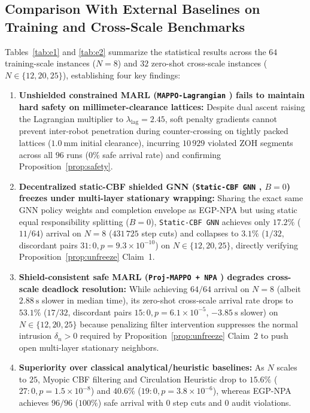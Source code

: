 \subsection{Comparison With External Baselines on Training and Cross-Scale Benchmarks}
Tables~\ref{tab:e1} and \ref{tab:e2} summarize the statistical results across the $64$ training-scale instances ($N=8$) and $32$ zero-shot cross-scale instances ($N\in\{12,20,25\}$), establishing four key findings:
\begin{enumerate}
 \item \textbf{Unshielded constrained MARL (\texttt{MAPPO-Lagrangian} \cite{gu2023safe}) fails to maintain hard safety on millimeter-clearance lattices:} Despite dual ascent raising the Lagrangian multiplier to $\lambda_{\mathrm{lag}}=2.45$, soft penalty gradients cannot prevent inter-robot penetration during counter-crossing on tightly packed lattices ($1.0\ \mathrm{mm}$ initial clearance), incurring $10\,929$ violated ZOH segments across all $96$ runs ($0\%$ safe arrival rate) and confirming Proposition~\ref{prop:safety}.
 \item \textbf{Decentralized static-CBF shielded GNN (\texttt{Static-CBF GNN} \cite{zhang2025gcbf,zhang2025dgppo}, $B=0$) freezes under multi-layer stationary wrapping:} Sharing the exact same GNN policy weights and completion envelope as EGP-NPA but using static equal responsibility splitting ($B=0$), \texttt{Static-CBF GNN} achieves only $17.2\%$ ($11/64$) arrival on $N=8$ ($431\,725$ step cuts) and collapses to $3.1\%$ ($1/32$, discordant pairs $31:0,p=9.3\times 10^{-10}$) on $N\in\{12,20,25\}$, directly verifying Proposition~\ref{prop:unfreeze} Claim~1.
 \item \textbf{Shield-consistent safe MARL (\texttt{Proj-MAPPO + NPA} \cite{wabersich2021,liu2026saferl}) degrades cross-scale deadlock resolution:} While achieving $64/64$ arrival on $N=8$ (albeit $2.88\ \mathrm s$ slower in median time), its zero-shot cross-scale arrival rate drops to $53.1\%$ ($17/32$, discordant pairs $15:0,p=6.1\times 10^{-5}$, $-3.85\ \mathrm s$ slower) on $N\in\{12,20,25\}$ because penalizing filter intervention suppresses the normal intrusion $\delta_n>0$ required by Proposition~\ref{prop:unfreeze} Claim~2 to push open multi-layer stationary neighbors.
 \item \textbf{Superiority over classical analytical/heuristic baselines:} As $N$ scales to $25$, Myopic CBF filtering and Circulation Heuristic drop to $15.6\%$ ($27:0,p=1.5\times 10^{-8}$) and $40.6\%$ ($19:0,p=3.8\times 10^{-6}$), whereas EGP-NPA achieves $96/96$ ($100\%$) safe arrival with $0$ step cuts and $0$ audit violations.
\end{enumerate}

